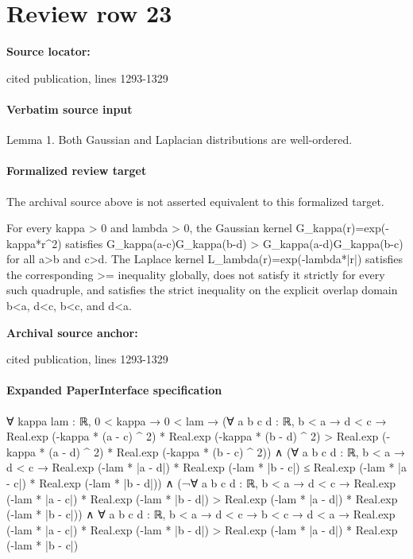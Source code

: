 \documentclass[10pt]{article}
\begin{document}
\section*{Review row 23}
\textbf{Source locator:} {\footnotesize\raggedright cited publication, lines 1293-\allowbreak{}1329\par}
\paragraph{Verbatim source input}
\begin{ReviewVerbatim}
Lemma 1. Both Gaussian and Laplacian distributions are well-ordered.
\end{ReviewVerbatim}


\paragraph{Formalized review target}
The archival source above is not asserted equivalent to this formalized target.
\begin{ReviewVerbatim}
For every kappa > 0 and lambda > 0, the Gaussian kernel G_kappa(r)=exp(-kappa*r^2) satisfies G_kappa(a-c)G_kappa(b-d) > G_kappa(a-d)G_kappa(b-c) for all a>b and c>d. The Laplace kernel L_lambda(r)=exp(-lambda*|r|) satisfies the corresponding >= inequality globally, does not satisfy it strictly for every such quadruple, and satisfies the strict inequality on the explicit overlap domain b<a, d<c, b<c, and d<a.
\end{ReviewVerbatim}

\textbf{Archival source anchor:} {\footnotesize\raggedright cited publication, lines 1293-\allowbreak{}1329\par}
\paragraph{Expanded PaperInterface specification}
\begin{ReviewVerbatim}
∀ {kappa lam : ℝ},
  0 < kappa →
    0 < lam →
      (∀ {{a b c d : ℝ}},
          b < a →
            d < c →
              Real.exp (-kappa * (a - c) ^ 2) * Real.exp (-kappa * (b - d) ^ 2) >
                Real.exp (-kappa * (a - d) ^ 2) * Real.exp (-kappa * (b - c) ^ 2)) ∧
        (∀ {{a b c d : ℝ}},
            b < a →
              d < c →
                Real.exp (-lam * |a - d|) * Real.exp (-lam * |b - c|) ≤
                  Real.exp (-lam * |a - c|) * Real.exp (-lam * |b - d|)) ∧
          (¬∀ {{a b c d : ℝ}},
                b < a →
                  d < c →
                    Real.exp (-lam * |a - c|) * Real.exp (-lam * |b - d|) >
                      Real.exp (-lam * |a - d|) * Real.exp (-lam * |b - c|)) ∧
            ∀ {a b c d : ℝ},
              b < a →
                d < c →
                  b < c →
                    d < a →
                      Real.exp (-lam * |a - c|) * Real.exp (-lam * |b - d|) >
                        Real.exp (-lam * |a - d|) * Real.exp (-lam * |b - c|)
\end{ReviewVerbatim}
\end{document}
